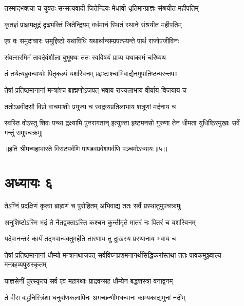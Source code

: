 \twolineshloka
{तस्माद्भक्त्या च युक्तः सन्सत्यवादी जितेन्द्रियः}
{मेधावी धृतिमान्प्राज्ञः संश्रयीत महीपतिम्}


\twolineshloka
{कृतज्ञं प्राज्ञमक्षुद्रं दृढभक्तिं जितेन्द्रियम्}
{वर्धमानं स्थितं स्थाने संश्रयीत महीपतिम्}


\twolineshloka
{एष वः समुदाचारः समुद्दिष्टो यथाविधि}
{यथार्थान्सम्प्रपत्स्यन्ते पार्थ राजोपजीविनः}


\twolineshloka
{संवत्सरमिमं तावदेवंशीला बुभूषथः}
{ततः स्वविषयं प्राप्य यथाकामं चरिष्यथ}



\twolineshloka
{तं तथेत्यब्रुवन्पार्थाः पितृकल्पं यशस्विनम्}
{प्रहृष्टाश्चाभिवाद्यैनमुपातिष्ठन्परन्तपाः}


\twolineshloka
{तेषां प्रतिष्ठमानानां मन्त्रांश्च ब्राह्मणोऽजपत्}
{भवाय राज्यलाभाय वीर्याय विजयाय च}


\twolineshloka
{ततोऽब्रवीदसौ विप्रो वाचमाशीः प्रयुज्य च}
{स्वद्रव्यप्रतिलाभाय शत्रूणां मर्दनाय च}


\threelineshloka
{स्वस्ति वोऽस्तु शिवः पन्था द्रक्ष्यामि पुनरागतान्}
{इत्युक्ता हृष्टमनसो गुरुणा तेन धीमता}
{युधिष्ठिरमुखाः सर्वे गन्तुं समुपचक्रमुः}

॥इति श्रीमन्महाभारते विराटपर्वणि पाण्डवप्रवेशपर्वणि पञ्चमोऽध्यायः॥५॥

\chapter{अध्यायः ६}

\twolineshloka
{तेऽग्निं प्रदक्षिणं कृत्वा ब्राह्मणं च पुरोहितम्}
{अभिवाद्य ततः सर्वे प्रस्थातुमुपचक्रमुः}




\twolineshloka
{अनुशिष्टोऽस्मि भद्रं ते नैतद्वक्ताऽस्ति कश्चन}
{कुन्तीमृते मातरं नः पितरं च यशस्विनम्}


\twolineshloka
{यदेवानन्तरं कार्यं तद्भवान्वक्तुमर्हति}
{तारणाय तु दुःखस्य प्रस्थानाय भवाय च}



\threelineshloka
{तेषां प्रतिष्ठमानानां धौम्यो मन्त्रानथाजपत्}
{सर्वविघ्नप्रशमनानर्थसिद्धिकरांस्तथा}
{ततः पावकमुञ्ज्वाल्य मन्त्रहव्यपुरुस्कृतम्}


\twolineshloka
{याज्ञसेनीं पुरस्कृत्य सर्व एव महारथाः}
{प्राद्रवन्सह धौम्येन बद्धशस्त्रा वनाद्वनम्}


\twolineshloka
{ते वीरा बद्धनिस्त्रिंशा धनुर्बाणकलापिनः}
{अगच्छन्भीमधन्वानः काम्यकाद्यमुनां नदीम्}



